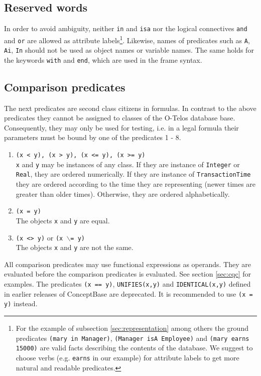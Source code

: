 \subsection{Reserved words}

In order to avoid ambiguity, neither {\tt in} and {\tt isa} nor the
logical connectives {\tt and} and {\tt or} are allowed as attribute
labels\footnote{For the example of subsection \ref{sec:representation} among others the
  ground predicates {\tt (mary in Manager)}, {\tt (Manager isA
    Employee)} and {\tt (mary earns 15000)} are valid facts describing
  the contents of the database. We suggest to choose verbs (e.g. {\tt earns}
  in our example) for attribute labels to get more natural and
  readable predicates.}.
Likewise, names of predicates such as {\tt A}, {\tt Ai}, {\tt In} should not be used as object names
or variable names. The same holds for the keywords {\tt with} and {\tt end}, which are used in the
frame syntax.


\subsection{Comparison predicates}
The next predicates are second class citizens in formulas. In contrast to the
above predicates they cannot be assigned to classes of the O-Telos database
base. Consequently, they may only be used for testing, i.e. in a legal
formula their parameters must be bound by one of the predicates 1 - 8.

\begin{enumerate}
\item {\tt (x < y), (x > y), (x <= y), (x >= y)}\\
{\tt x} and {\tt y} may be instances of any class. If they are instance of {\tt Integer} or
{\tt Real}, they are ordered numerically. If they are instance of {\tt TransactionTime} they
are ordered according to the time they are representing (newer times are greater than older
times). Otherwise, they are ordered alphabetically.
\item {\tt (x = y)} \\
The objects {\tt x} and {\tt y} are equal. 
\item {\tt (x <> y)} or {\tt (x $\backslash$= y)}\\
The objects {\tt x} and {\tt y} are not the same. 
\end{enumerate}

All comparison predicates may use functional expressions as operands.
They are evaluated before the comparison predicates is evaluated. See
section \ref{sec:cqc} for examples.
The predicates {\tt (x == y)}, {\tt UNIFIES(x,y)} and {\tt IDENTICAL(x,y)} defined in earlier releases of ConceptBase are deprecated. It is recommended to use
{\tt (x = y)} instead.



